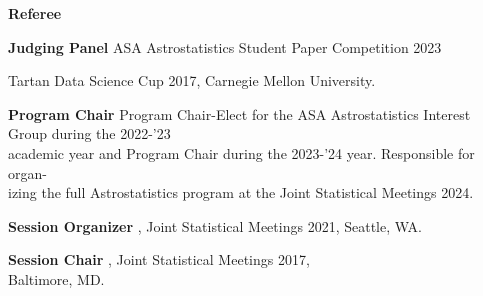 \documentclass[letterpaper,10pt]{article}
\begin{document}
\begin{addmargin}[0.25cm]{2ex}

{\bf Referee}
\hspace{13.5ex}{\it Astronomy and Computing (A\&C)} 

\vspace{0.15cm}

\hspace{23ex}{\it Journal of Cosmology and Astroparticle Physics (JCAP)} 

\vspace{0.15cm}

\hspace{23ex}{\it NASA Experimental Program to Stimulate Competitive Research (EPSCoR)} 

\vspace{0.15cm}

\hspace{23ex}{\it CHANCE Magazine}


\vspace{.4cm}

{\bf Judging Panel}
\indent\hspace{5.35ex}ASA Astrostatistics Student Paper Competition 2023 

\vspace{0.15cm}

\hspace{22.75ex}Tartan Data Science Cup 2017, Carnegie Mellon University.

\vspace{.4cm}


{\bf Program Chair}
\indent\hspace{4.9ex}Program Chair-Elect for the ASA Astrostatistics Interest Group during the 2022-'23\\
\indent\hspace{23ex}academic year and Program Chair during the 2023-'24 year. Responsible for organ-\\
\indent\hspace{23ex}izing the full Astrostatistics program at the Joint Statistical Meetings 2024.

\vspace{.4cm}

{\bf Session Organizer}
\indent\hspace{1.35ex}{\it Statistical Challenges in Cosmology}, Joint Statistical Meetings 2021, Seattle, WA.

\vspace{.4cm}

{\bf Session Chair}
\indent\hspace{6.1ex}{\it Computing, Graphics, and Programming Statistics}, Joint Statistical Meetings 2017,\\
\indent\hspace{23ex}Baltimore, MD.

\end{addmargin}
\end{document}
